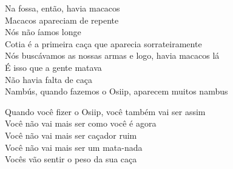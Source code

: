 \bigskip

\begin{linenumbers}
 
\noindent  Na fossa, então, havia macacos\\
 Macacos apareciam de repente\\
 Nós não íamos longe\\
 Cotia é a primeira caça que aparecia sorrateiramente\\
 Nós buscávamos as nossas armas e logo, havia macacos lá\\
 É isso que a gente matava\\
 Não havia falta de caça\\
 Nambús, quando fazemos o Osiip, aparecem muitos nambus
 
\end{linenumbers}

\bigskip

\begin{linenumbers}
 
\noindent  Quando você fizer o Osiip, você também vai ser assim\\
 Você não vai mais ser como você é agora\\
 Você não vai mais ser caçador ruim\\
 Você não vai mais ser um mata-nada\\
 Vocês vão sentir o peso da sua caça
 
\end{linenumbers}

\bigskip

